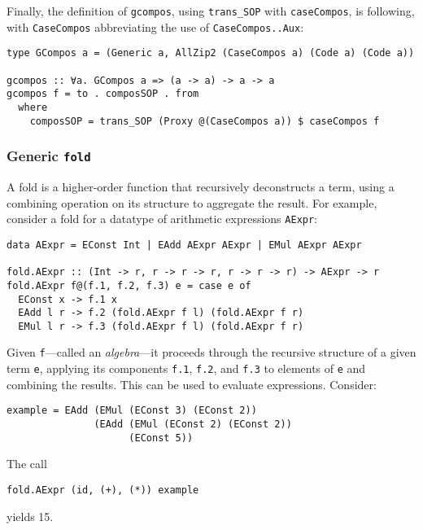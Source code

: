 \documentclass[runningheads]{llncs}
\newcommand{\K}[1]{\lstinline[style=fancy]{#1}}
\begin{document}
Finally, the definition of \K{gcompos}, using \K{trans_SOP} with \K{caseCompos}, is following, with \K{CaseCompos} abbreviating the use of \K{CaseCompos..Aux}:
\begin{lstlisting}[style=fancy]
type GCompos a = (Generic a, AllZip2 (CaseCompos a) (Code a) (Code a))

gcompos :: ∀a. GCompos a => (a -> a) -> a -> a
gcompos f = to . composSOP . from
  where
    composSOP = trans_SOP (Proxy @(CaseCompos a)) $ caseCompos f
\end{lstlisting}

\subsubsection{Generic \K{fold}}

A fold is a higher-order function that recursively deconstructs a term, using a combining operation on its structure to aggregate the result. For example, consider a fold for a datatype of arithmetic expressions \K{AExpr}:
\begin{lstlisting}[style=fancy]
data AExpr = EConst Int | EAdd AExpr AExpr | EMul AExpr AExpr

fold.AExpr :: (Int -> r, r -> r -> r, r -> r -> r) -> AExpr -> r
fold.AExpr f@(f.1, f.2, f.3) e = case e of
  EConst x -> f.1 x
  EAdd l r -> f.2 (fold.AExpr f l) (fold.AExpr f r)
  EMul l r -> f.3 (fold.AExpr f l) (fold.AExpr f r)
\end{lstlisting}
Given \K{f}---called an \emph{algebra}---it proceeds through the recursive structure of a given term \K{e}, applying its components \K{f.1}, \K{f.2}, and \K{f.3} to elements of \K{e} and combining the results. This can be used to evaluate expressions. Consider:
\begin{lstlisting}[style=fancy]
example = EAdd (EMul (EConst 3) (EConst 2))
               (EAdd (EMul (EConst 2) (EConst 2))
                     (EConst 5))
\end{lstlisting}
The call
\begin{lstlisting}[style=fancy]
fold.AExpr (id, (+), (*)) example
\end{lstlisting}
yields 15.
\end{document}
